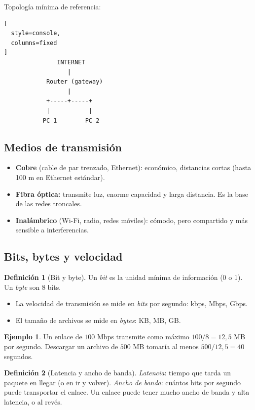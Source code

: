 \documentclass[11pt,a4paper]{article}
\theoremstyle{definition}
\newtheorem{definicion}{Definición}[section]
\newtheorem{ejemplo}{Ejemplo}[section]
\theoremstyle{remark}
\begin{document}
Topología mínima de referencia:
\begin{lstlisting}[
  style=console,
  columns=fixed
]
               INTERNET
                  |
            Router (gateway)
                  |
            +-----+-----+
            |           |
           PC 1        PC 2
\end{lstlisting}

\subsection{Medios de transmisión}

\begin{itemize}
  \item \textbf{Cobre} (cable de par trenzado, Ethernet): económico, distancias cortas (hasta 100 m en Ethernet estándar).
  \item \textbf{Fibra óptica:} transmite luz, enorme capacidad y larga distancia. Es la base de las redes troncales.
  \item \textbf{Inalámbrico} (Wi-Fi, radio, redes móviles): cómodo, pero compartido y más sensible a interferencias.
\end{itemize}

\subsection{Bits, bytes y velocidad}

\begin{definicion}[Bit y byte]
Un \emph{bit} es la unidad mínima de información (0 o 1). Un \emph{byte} son 8 bits.
\end{definicion}
\begin{itemize}
  \item La velocidad de transmisión se mide en \emph{bits} por segundo: kbps, Mbps, Gbps.
  \item El tamaño de archivos se mide en \emph{bytes}: KB, MB, GB.
\end{itemize}

\begin{ejemplo}
Un enlace de $100$ Mbps transmite como máximo $100/8 = 12{,}5$ MB por segundo. Descargar un archivo de $500$ MB tomaría al menos $500/12{,}5 = 40$ segundos.
\end{ejemplo}

\begin{definicion}[Latencia y ancho de banda]
\emph{Latencia}: tiempo que tarda un paquete en llegar (o en ir y volver). \emph{Ancho de banda}: cuántos bits por segundo puede transportar el enlace. Un enlace puede tener mucho ancho de banda y alta latencia, o al revés.
\end{definicion}
\end{document}
